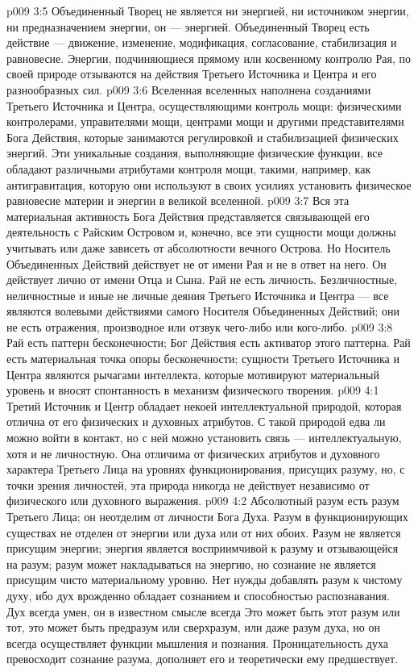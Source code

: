 \vs p009 3:5 \pc Объединенный Творец не является ни энергией, ни источником энергии, ни предназначением энергии, он ---  энергией. Объединенный Творец есть действие --- движение, изменение, модификация, согласование, стабилизация и равновесие. Энергии, подчиняющиеся прямому или косвенному контролю Рая, по своей природе отзываются на действия Третьего Источника и Центра и его разнообразных сил.
\vs p009 3:6 Вселенная вселенных наполнена созданиями Третьего Источника и Центра, осуществляющими контроль мощи: физическими контролерами, управителями мощи, центрами мощи и другими представителями Бога Действия, которые занимаются регулировкой и стабилизацией физических энергий. Эти уникальные создания, выполняющие физические функции, все обладают различными атрибутами контроля мощи, такими, например, как антигравитация, которую они используют в своих усилиях установить физическое равновесие материи и энергии в великой вселенной.
\vs p009 3:7 Вся эта материальная активность Бога Действия представляется связывающей его деятельность с Райским Островом и, конечно, все эти сущности мощи должны учитывать или даже зависеть от абсолютности вечного Острова. Но Носитель Объединенных Действий действует не от имени Рая и не в ответ на него. Он действует лично от имени Отца и Сына. Рай не есть личность. Безличностные, неличностные и иные не личные деяния Третьего Источника и Центра --- все являются волевыми действиями самого Носителя Объединенных Действий; они не есть отражения, производное или отзвук чего\hyp{}либо или кого\hyp{}либо.
\vs p009 3:8 Рай есть паттерн бесконечности; Бог Действия есть активатор этого паттерна. Рай есть материальная точка опоры бесконечности; сущности Третьего Источника и Центра являются рычагами интеллекта, которые мотивируют материальный уровень и вносят спонтанность в механизм физического творения.
\vs p009 4:1 Третий Источник и Центр обладает некоей интеллектуальной природой, которая отлична от его физических и духовных атрибутов. С такой природой едва ли можно войти в контакт, но с ней можно установить связь --- интеллектуальную, хотя и не личностную. Она отличима от физических атрибутов и духовного характера Третьего Лица на уровнях функционирования, присущих разуму, но, с точки зрения личностей, эта природа никогда не действует независимо от физического или духовного выражения.
\vs p009 4:2 Абсолютный разум есть разум Третьего Лица; он неотделим от личности Бога Духа. Разум в функционирующих существах не отделен от энергии или духа или от них обоих. Разум не является присущим энергии; энергия является восприимчивой к разуму и отзывающейся на разум; разум может накладываться на энергию, но сознание не является присущим чисто материальному уровню. Нет нужды добавлять разум к чистому духу, ибо дух врожденно обладает сознанием и способностью распознавания. Дух всегда умен, он в известном смысле всегда  Это может быть этот разум или тот, это может быть предразум или сверхразум, или даже разум духа, но он всегда осуществляет функции мышления и познания. Проницательность духа превосходит сознание разума, дополняет его и теоретически ему предшествует.
